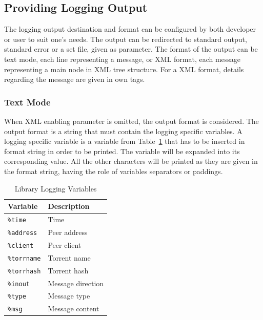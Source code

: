 \subsection{Providing Logging Output}

The logging output destination and format can be configured by both developer
or user to suit one's needs. The output can be redirected to standard output,
standard error or a set file, given as parameter. The format of the output can
be text mode, each line representing a message, or XML format, each message
representing a main node in XML tree structure. For a XML format, details
regarding the message are given in own tags.

\subsubsection{Text Mode}

When XML enabling parameter is omitted, the output format is considered. The
output format is a string that must contain the logging specific variables. A
logging specific variable is a variable from
Table~\ref{tab:proto-measure:liblog-variables} that has to be inserted in
format string in order to be printed. The variable will be expanded into its
corresponding value. All the other characters will be printed as they are
given in the format string, having the role of variables separators or
paddings.

\begin{table}[htb]
  \centering
  \caption{Library Logging Variables}
  \label{tab:proto-measure:liblog-variables}
  \begin{tabular}{@{}ll@{}}
    \toprule
      \textbf{Variable} & \textbf{Description} \\
    \midrule
      \texttt{\%time} & Time \\
      \texttt{\%address} & Peer address \\
      \texttt{\%client} & Peer client \\
      \texttt{\%torrname} & Torrent name \\
      \texttt{\%torrhash} & Torrent hash \\
      \texttt{\%inout} & Message direction \\
      \texttt{\%type} & Message type \\
      \texttt{\%msg} & Message content \\
    \bottomrule
  \end{tabular}
\end{table}

